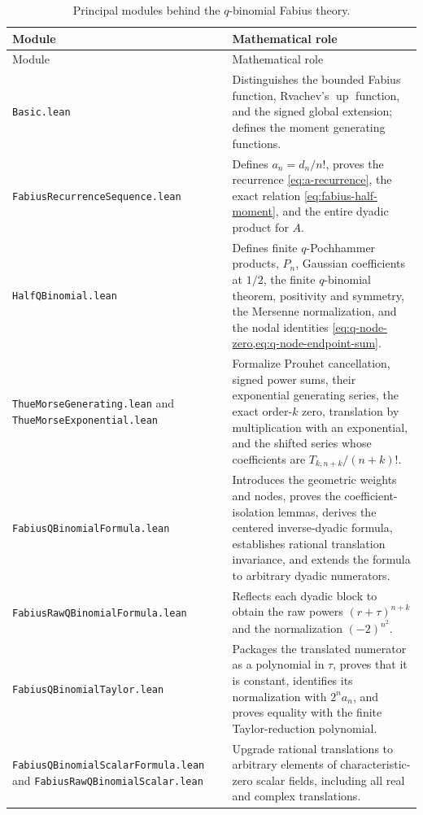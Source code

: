 \documentclass[11pt]{article}
\theoremstyle{definition}
\newcommand{\Up}{\operatorname{up}}
\newcommand{\lean}[1]{\nolinkurl{#1}}
\begin{document}
\begin{longtable}{>{\raggedright\arraybackslash\small}p{} >{\raggedright\arraybackslash}p{}}
\caption{Principal modules behind the $q$-binomial Fabius theory.}\label{tab:lean-modules}\\
\toprule
Module & Mathematical role \\
\midrule
\endfirsthead
\toprule
Module & Mathematical role \\
\midrule
\endhead
\lean{Basic.lean} & Distinguishes the bounded Fabius function, Rvachev's $\Up$ function, and the signed global extension; defines the moment generating functions. \\
\addlinespace
\lean{FabiusRecurrenceSequence.lean} & Defines $a_n=d_n/n!$, proves the recurrence \cref{eq:a-recurrence}, the exact relation \cref{eq:fabius-half-moment}, and the entire dyadic product for $A$. \\
\addlinespace
\lean{HalfQBinomial.lean} & Defines finite $q$-Pochhammer products, $P_n$, Gaussian coefficients at $1/2$, the finite $q$-binomial theorem, positivity and symmetry, the Mersenne normalization, and the nodal identities \cref{eq:q-node-zero,eq:q-node-endpoint-sum}. \\
\addlinespace
\lean{ThueMorseGenerating.lean} and \lean{ThueMorseExponential.lean} & Formalize Prouhet cancellation, signed power sums, their exponential generating series, the exact order-$k$ zero, translation by multiplication with an exponential, and the shifted series whose coefficients are $T_{k,n+k}/(n+k)!$. \\
\addlinespace
\lean{FabiusQBinomialFormula.lean} & Introduces the geometric weights and nodes, proves the coefficient-isolation lemmas, derives the centered inverse-dyadic formula, establishes rational translation invariance, and extends the formula to arbitrary dyadic numerators. \\
\addlinespace
\lean{FabiusRawQBinomialFormula.lean} & Reflects each dyadic block to obtain the raw powers $(r+\tau)^{n+k}$ and the normalization $(-2)^{n^2}$. \\
\addlinespace
\lean{FabiusQBinomialTaylor.lean} & Packages the translated numerator as a polynomial in $\tau$, proves that it is constant, identifies its normalization with $2^na_n$, and proves equality with the finite Taylor-reduction polynomial. \\
\addlinespace
\lean{FabiusQBinomialScalarFormula.lean} and \lean{FabiusRawQBinomialScalar.lean} & Upgrade rational translations to arbitrary elements of characteristic-zero scalar fields, including all real and complex translations. \\

\end{longtable}
\end{document}
